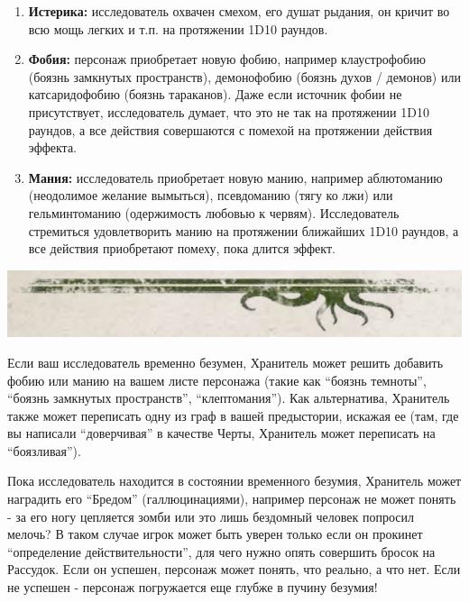 \documentclass[letterpaper,twocolumn,openany, twoside, 11pt, usenames]{cocbook}
\begin{document}
\begin{fullcocpaperbox}{}{}
\begin{multicols}{2}
\begin{enumerate}
    \item \textbf{Истерика:} исследователь охвачен смехом, его душат рыдания, он кричит во всю мощь легких и т.п. на протяжении 1D10 раундов.
    \item \textbf{Фобия:} персонаж приобретает новую фобию, например клаустрофобию (боязнь замкнутых пространств), демонофобию (боязнь духов / демонов) или катсаридофобию (боязнь тараканов). Даже если источник фобии не присутствует, исследователь думает, что это не так на протяжении 1D10 раундов, а все действия совершаются с помехой на протяжении действия эффекта.
    \item \textbf{Мания:} исследователь приобретает новую манию, например аблютоманию (неодолимое желание вымыться), псевдоманию (тягу ко лжи) или гельминтоманию (одержимость любовью к червям). Исследователь стремиться удовлетворить манию на протяжении ближайших 1D10 раундов, а все действия приобретают помеху, пока длится эффект.
  \end{enumerate}
  \end{multicols}
  \includegraphics[width=\linewidth]{img/bottom.png}
  \end{fullcocpaperbox}{}{}
Если ваш исследователь временно безумен, Хранитель может решить добавить фобию или манию на вашем листе персонажа (такие как ``боязнь темноты'', ``боязнь замкнутых пространств'', ``клептомания''). Как альтернатива, Хранитель также может переписать одну из граф в вашей предыстории, искажая ее (там, где вы написали ``доверчивая'' в качестве Черты, Хранитель может переписать на ``боязливая'').

Пока исследователь находится в состоянии временного безумия, Хранитель может наградить его ``Бредом'' (галлюцинациями), например персонаж не может понять - за его ногу цепляется зомби или это лишь бездомный человек попросил мелочь? В таком случае игрок может быть уверен только если он прокинет ``определение действительности'', для чего нужно опять совершить бросок на Рассудок. Если он успешен, персонаж может понять, что реально, а что нет. Если не успешен - персонаж погружается еще глубже в пучину безумия!
\end{document}
